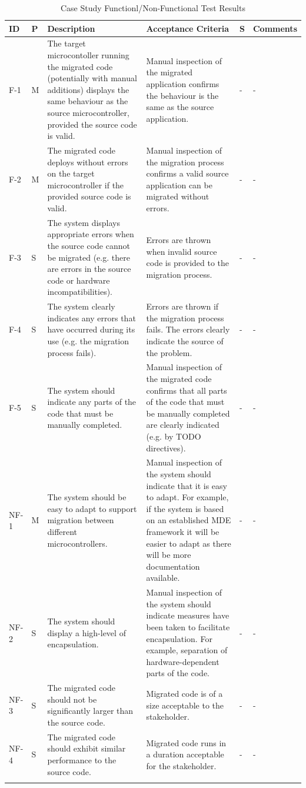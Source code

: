 \documentclass{UoYCSproject}
\newcommand{\ra}[1]{\renewcommand{\arraystretch}{#1}}
\begin{document}
\begin{landscape}
\ra{1.3}
  \begin{longtable}{@{}p{}p{}p{}p{}p{}p{}@{}} \toprule 
  \textbf{ID} & \textbf{P} & \textbf{Description} & \textbf{Acceptance Criteria} &\textbf{S} & \textbf{Comments} \\
  \midrule
      F-1 & M & The target microcontoller running the migrated code (potentially with manual additions) displays the same behaviour as the source microcontroller, provided the source code is valid. & Manual inspection of the migrated application confirms the behaviour is the same as the source application. & - & - \\
  F-2 & M & The migrated code deploys without errors on the target microcontroller if the provided source code is valid. & Manual inspection of the migration process confirms a valid source application can be migrated without errors. & - & - \\
  F-3 & S & The system displays appropriate errors when the source code cannot be migrated (e.g. there are errors in the source code or hardware incompatibilities). & Errors are thrown when invalid source code is provided to the migration process. & - & - \\  
  F-4 & S & The system clearly indicates any errors that have occurred during its use (e.g. the migration process fails). & Errors are thrown if the migration process fails. The errors clearly indicate the source of the problem. & - & - \\
  F-5 & S & The system should indicate any parts of the code that must be manually completed. & Manual inspection of the migrated code confirms that all parts of the code that must be manually completed are clearly indicated (e.g. by TODO directives). & - & - \\
    NF-1 & M & The system should be easy to adapt to support migration between different microcontrollers. & Manual inspection of the system should indicate that it is easy to adapt. For example, if the system is based on an established MDE framework it will be easier to adapt as there will be more documentation available. & - & - \\
  NF-2 & S & The system should display a high-level of encapsulation. & Manual inspection of the system should indicate measures have been taken to facilitate encapsulation. For example, separation of hardware-dependent parts of the code. & - & - \\
  NF-3 & S & The migrated code should not be significantly larger than the source code. & Migrated code is of a size acceptable to the stakeholder. & - & - \\
  NF-4 & S & The migrated code should exhibit similar performance to the source code. & Migrated code runs in a duration acceptable for the stakeholder. & - & - \\
    \bottomrule
\caption{Case Study Functionl/Non-Functional Test Results}
\label{table:case_study_func_test_results}
  \end{longtable}
\end{landscape}
\end{document}
